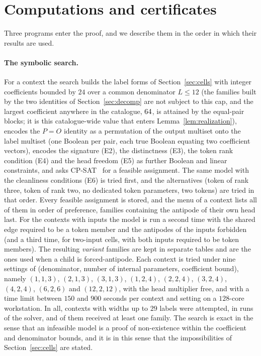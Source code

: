 \documentclass[11pt,a4paper]{article}
\theoremstyle{plain}
\theoremstyle{definition}
\theoremstyle{remark}
\newcommand{\PO}{P\!=\!O}
\begin{document}


\section{Computations and certificates}\label{sec:verification}

Three programs enter the proof, and we describe them in the order in which
their results are used.

\paragraph{The symbolic search.}
For a context the search builds the label forms of Section~\ref{sec:cells}
with integer coefficients bounded by $24$ over a common denominator $L\le 12$
(the families built by the two identities of Section~\ref{sec:decomp} are not
subject to this cap, and the largest coefficient anywhere in the catalogue,
$64$, is attained by the equal-pair blocks; it is this
catalogue-wide value that enters Lemma~\ref{lem:realization}),
encodes the $\PO$ identity as a permutation of the output multiset onto the
label multiset (one Boolean per pair, each true Boolean equating two
coefficient vectors), encodes the signature (E2), the distinctness (E3), the
token rank condition (E4) and the head freedom (E5) as further Boolean and
linear constraints, and asks CP-SAT~\cite{ORTools} for a feasible assignment.
The same model with the cleanliness conditions (E6) is tried first, and the
alternatives (token of rank three, token of rank two, no dedicated token
parameters, two tokens) are tried in that order.  Every feasible assignment
is stored, and the menu of a context lists all of them in order of
preference, families containing the antipode of their own head last.  For
the contexts with inputs the model is run a second time with the shared edge
required to be a token member and the antipodes of the inputs forbidden
(and a third time, for two-input cells, with both inputs required to be
token members).  The resulting \emph{variant} families are kept in separate
tables and are the ones used when a child is forced-antipode.  Each context is tried under nine settings of (denominator, number of
internal parameters, coefficient bound), namely $(1,1,3)$, $(2,1,3)$,
$(3,1,3)$, $(1,2,4)$, $(2,2,4)$, $(3,2,4)$, $(4,2,4)$, $(6,2,6)$ and
$(12,2,12)$, with the head multiplier free, and with a time limit between
$150$ and $900$ seconds per context and setting on a $128$-core workstation.
In all, \NumAttempted{} contexts with widths up to $29$ labels were attempted,
in \NumSolverRuns{} runs of the solver, and \NumReceived{} of them received at
least one family.
The search is exact in the sense that an infeasible model is a proof of
non-existence within the coefficient and denominator bounds, and it is in
this sense that the impossibilities of Section~\ref{sec:cells} are stated.
\end{document}
